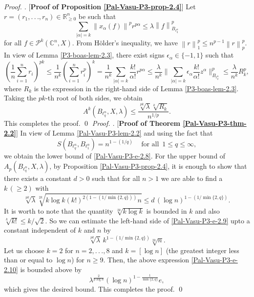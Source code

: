\documentclass[a4paper,12pt]{amsart}
\theoremstyle{definition}
\newenvironment{pf}[1][]{%
 \vskip 3mm
 \noindent
 \ifthenelse{\equal{#1}{}}%
  {{\slshape Proof. }}%
  {{\slshape #1.} }%
 }%
{\qed\bigskip}
\newcommand{\norm}[1]{\left\lVert#1\right\rVert}
\begin{document}
\begin{pf} [{\bf Proof of Proposition \ref{Pal-Vasu-P3-prop-2.4}}]
	Let $r=(r_1,.\,.\,., r_n)\in \mathbb{R}^n_{\geq 0}$ be such that 
	\begin{equation*}
		\sum_{|\alpha|=k}\norm{x_{\alpha}(f)}^pr^{p\alpha} \leq \lambda \norm{f}^p_{B_{\ell^n_q}}
	\end{equation*}
	for all $f\in \mathcal{P}^k(\mathbb{C}^n, X)$. From H\"older's inequality, we have $\norm{r}^p_{1}\leq n^{p-1}\norm{r}^p_{p}$. In view of Lemma \ref{P3-boas-lem-2.3}, there exist signs $\epsilon_{\alpha}\in\{-1,1\}$ such that
	\begin{equation*}
		\left(\frac{1}{n}\sum_{i=1}^{n}r_i\right)^{pk}\leq
	\frac{1}{n^k}\left(\sum_{i=1}^{n}r^p_{i} \right)^k	= \frac{1}{n^k}\sum_{|\alpha|=k}\frac{k!}{\alpha!}r^{p\alpha}\leq \frac{\lambda}{n^k}\bigg\|\sum_{|\alpha|=k}\epsilon_{\alpha}\frac{k!}{\alpha!}z^{\alpha}\bigg\|^p_{B_{\ell^n_q}}\leq \frac{\lambda}{n^k}R^p_k,
	\end{equation*}
	where $R_k$ is the expression in the right-hand side of Lemma \ref{P3-boas-lem-2.3}. Taking the $pk$-th root of both sides, we obtain
	\begin{equation*}
		A^k(B_{\ell^n_q},X, \lambda) \leq \frac{\sqrt[pk]{\lambda}\sqrt[k]{R_k}}{n^{1/p}}.
	\end{equation*}
	This completes the proof.
\end{pf}
\vspace{-4mm}
\begin{pf} [{\bf Proof of Theorem \ref{Pal-Vasu-P3-thm-2.2}}]
	In view of Lemma \ref{Pal-Vasu-P3-lem-2.2} and using the fact that 
	\begin{equation*}
		S(B_{\ell^n_q}, B_{\ell^n_1})=n^{1-(1/q)} \quad\, \mbox{for all}\,\,\,1\leq q\leq \infty,
	\end{equation*}
	we obtain the lower bound of \eqref{Pal-Vasu-P3-e-2.8}. For the upper bound of $A_p(B_{\ell^n_q}, X, \lambda)$, by Proposition \ref{Pal-Vasu-P3-prop-2.4}, it is enough to show that there exists a constant $d>0$ such that for all $n>1$ we are able to find a $k\,(\geq 2)$ with
	\begin{equation}\label{Pal-Vasu-P3-e-2.9}
		\sqrt[pk]{\lambda} \sqrt[2k]{k \log k (k!)^{2\left(1-\left(1/\min \{2, q\}\right)\right)}n} \leq d\, \left(\log n\right)^{1-\left(1/\min \{2, q\}\right)}.
	\end{equation}
	It is worth to note that the quantity $\sqrt[2k]{k\log k}$ is bounded in $k$ and also $\sqrt[k]{k!}\leq k/\sqrt{2}.$ So we can estimate the left-hand side of \eqref{Pal-Vasu-P3-e-2.9} upto a constant independent of $k$ and $n$ by
	\begin{equation}\label{Pal-Vasu-P3-e-2.10}
		\sqrt[pk]{\lambda}\,k^{1-\left(1/\min\{2, q\}\right)}\sqrt[2k]{n}.
	\end{equation}
	Let us choose $k=2$ for $n=2,.\,.\,.,8$ and $k=[\log n]$ (the greatest integer less than or equal to $\log n$) for $n \geq 9$. Then, the above expression \eqref{Pal-Vasu-P3-e-2.10} is bounded above by 
	\begin{equation*}
		\lambda^{\frac{2}{p\log n}}(\log n)^{1-\frac{1}{\min \{2, q\}}}e, 
	\end{equation*}
	which gives the desired bound. This completes the proof.
\end{pf}
\end{document}
